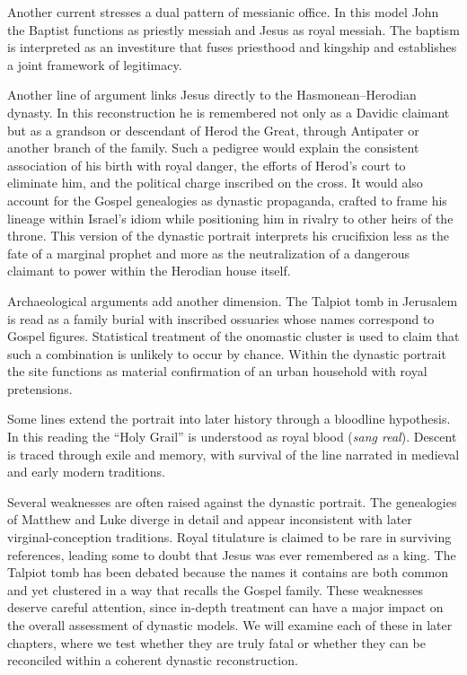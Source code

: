 Another current stresses a dual pattern of messianic office.
In this model John the Baptist functions as priestly messiah and Jesus as royal messiah.
The baptism is interpreted as an investiture that fuses priesthood and kingship and establishes a joint framework of legitimacy.

Another line of argument links Jesus directly to the Hasmonean–Herodian dynasty.
In this reconstruction he is remembered not only as a Davidic claimant but as a grandson or descendant of Herod the Great, through Antipater or another branch of the family.
Such a pedigree would explain the consistent association of his birth with royal danger, the efforts of Herod’s court to eliminate him, and the political charge inscribed on the cross.
It would also account for the Gospel genealogies as dynastic propaganda, crafted to frame his lineage within Israel’s idiom while positioning him in rivalry to other heirs of the throne.
This version of the dynastic portrait interprets his crucifixion less as the fate of a marginal prophet and more as the neutralization of a dangerous claimant to power within the Herodian house itself.

Archaeological arguments add another dimension.
The Talpiot tomb in Jerusalem is read as a family burial with inscribed ossuaries whose names correspond to Gospel figures.
Statistical treatment of the onomastic cluster is used to claim that such a combination is unlikely to occur by chance.
Within the dynastic portrait the site functions as material confirmation of an urban household with royal pretensions.

Some lines extend the portrait into later history through a bloodline hypothesis.
In this reading the ``Holy Grail'' is understood as royal blood (\emph{sang real}).
Descent is traced through exile and memory, with survival of the line narrated in medieval and early modern traditions.

Several weaknesses are often raised against the dynastic portrait.
The genealogies of Matthew and Luke diverge in detail and appear inconsistent with later virginal-conception traditions.
Royal titulature is claimed to be rare in surviving references, leading some to doubt that Jesus was ever remembered as a king.
The Talpiot tomb has been debated because the names it contains are both common and yet clustered in a way that recalls the Gospel family.
These weaknesses deserve careful attention, since in-depth treatment can have a major impact on the overall assessment of dynastic models.
We will examine each of these in later chapters, where we test whether they are truly fatal or whether they can be reconciled within a coherent dynastic reconstruction.

